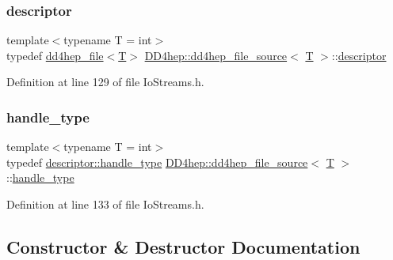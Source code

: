 \subsubsection{\texorpdfstring{descriptor}{descriptor}}
{\footnotesize\ttfamily template$<$typename T = int$>$ \\
typedef \hyperlink{class_d_d4hep_1_1dd4hep__file}{dd4hep\+\_\+file}$<$\hyperlink{class_t}{T}$>$ \hyperlink{class_d_d4hep_1_1dd4hep__file__source}{D\+D4hep\+::dd4hep\+\_\+file\+\_\+source}$<$ \hyperlink{class_t}{T} $>$\+::\hyperlink{class_d_d4hep_1_1dd4hep__file__source_acd7bec0e43b763cf692f18ce75a4dba8}{descriptor}}



Definition at line 129 of file Io\+Streams.\+h.

\hypertarget{class_d_d4hep_1_1dd4hep__file__source_abdabe1da6c2a2b2297dc86f41368c234}{}\label{class_d_d4hep_1_1dd4hep__file__source_abdabe1da6c2a2b2297dc86f41368c234} 
\subsubsection{\texorpdfstring{handle\+\_\+type}{handle\_type}}
{\footnotesize\ttfamily template$<$typename T = int$>$ \\
typedef \hyperlink{class_d_d4hep_1_1dd4hep__file_a4d79f8d433cd7831ff818691424cd6fc}{descriptor\+::handle\+\_\+type} \hyperlink{class_d_d4hep_1_1dd4hep__file__source}{D\+D4hep\+::dd4hep\+\_\+file\+\_\+source}$<$ \hyperlink{class_t}{T} $>$\+::\hyperlink{class_d_d4hep_1_1dd4hep__file_a4d79f8d433cd7831ff818691424cd6fc}{handle\+\_\+type}}



Definition at line 133 of file Io\+Streams.\+h.



\subsection{Constructor \& Destructor Documentation}
\hypertarget{class_d_d4hep_1_1dd4hep__file__source_a030d8a2563b52d4ea5f206e2d1dbaef5}{}\label{class_d_d4hep_1_1dd4hep__file__source_a030d8a2563b52d4ea5f206e2d1dbaef5} 
